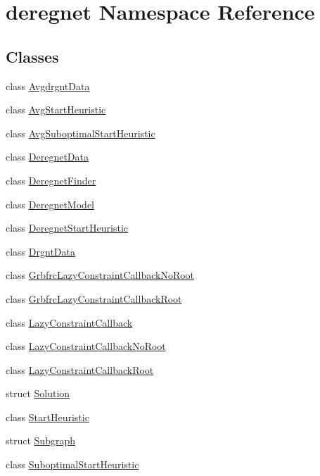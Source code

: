\hypertarget{namespacederegnet}{}\section{deregnet Namespace Reference}
\label{namespacederegnet}
\subsection*{Classes}
\begin{DoxyCompactItemize}
\item 
class \hyperlink{classderegnet_1_1AvgdrgntData}{Avgdrgnt\+Data}
\item 
class \hyperlink{classderegnet_1_1AvgStartHeuristic}{Avg\+Start\+Heuristic}
\item 
class \hyperlink{classderegnet_1_1AvgSuboptimalStartHeuristic}{Avg\+Suboptimal\+Start\+Heuristic}
\item 
class \hyperlink{classderegnet_1_1DeregnetData}{Deregnet\+Data}
\item 
class \hyperlink{classderegnet_1_1DeregnetFinder}{Deregnet\+Finder}
\item 
class \hyperlink{classderegnet_1_1DeregnetModel}{Deregnet\+Model}
\item 
class \hyperlink{classderegnet_1_1DeregnetStartHeuristic}{Deregnet\+Start\+Heuristic}
\item 
class \hyperlink{classderegnet_1_1DrgntData}{Drgnt\+Data}
\item 
class \hyperlink{classderegnet_1_1GrbfrcLazyConstraintCallbackNoRoot}{Grbfrc\+Lazy\+Constraint\+Callback\+No\+Root}
\item 
class \hyperlink{classderegnet_1_1GrbfrcLazyConstraintCallbackRoot}{Grbfrc\+Lazy\+Constraint\+Callback\+Root}
\item 
class \hyperlink{classderegnet_1_1LazyConstraintCallback}{Lazy\+Constraint\+Callback}
\item 
class \hyperlink{classderegnet_1_1LazyConstraintCallbackNoRoot}{Lazy\+Constraint\+Callback\+No\+Root}
\item 
class \hyperlink{classderegnet_1_1LazyConstraintCallbackRoot}{Lazy\+Constraint\+Callback\+Root}
\item 
struct \hyperlink{structderegnet_1_1Solution}{Solution}
\item 
class \hyperlink{classderegnet_1_1StartHeuristic}{Start\+Heuristic}
\item 
struct \hyperlink{structderegnet_1_1Subgraph}{Subgraph}
\item 
class \hyperlink{classderegnet_1_1SuboptimalStartHeuristic}{Suboptimal\+Start\+Heuristic}
\end{DoxyCompactItemize}
